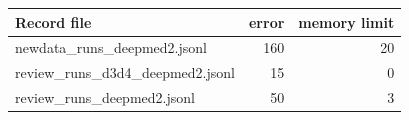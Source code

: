 \begin{tabular}{lrr}\toprule
Record file & error & memory limit \\\midrule
newdata\_runs\_deepmed2.jsonl & 160 & 20 \\
review\_runs\_d3d4\_deepmed2.jsonl & 15 & 0 \\
review\_runs\_deepmed2.jsonl & 50 & 3 \\
\bottomrule\end{tabular}
